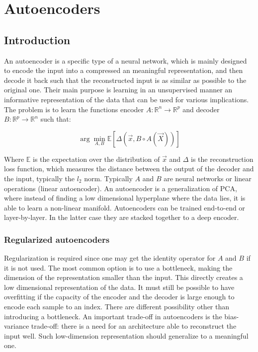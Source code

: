 \chapter{Autoencoders}

\section{Introduction}
An autoencoder is a specific type of a neural network, which is mainly designed to encode the input into a compressed an meaningful representation, and then decode it back such that the reconstructed input is as similar as possible to the original one.
Their main purpose is learning in an unsupervised manner an informative representation of the data that can be used for various implications.
The problem is to learn the functions encoder $A:\mathbb{R}^n\rightarrow\mathbb{R}^p$ and decoder $B:\mathbb{R}^p\rightarrow \mathbb{R}^n$ such that:

$$\arg\min\limits_{A, B}\mathbb{E}[\Delta(\vec{x}, B\circ A(\vec{X}))]$$

Where $\mathbb{E}$ is the expectation over the distribution of $\vec{x}$ and $\Delta$ is the reconstruction loss function, which measures the distance between the output of the decoder and the input, typically the $l_2$ norm.
Typically $A$ and $B$ are neural networks or linear operations (linear autoencoder).
An autoencoder is a generalization of PCA, where instead of finding a low dimensional hyperplane where the data lies, it is able to learn a non-linear manifold.
Autoencoders can be trained end-to-end or layer-by-layer.
In the latter case they are stacked together to a deep encoder.

	\subsection{Regularized autoencoders}
	Regularization is required since one may get the identity operator for $A$ and $B$ if it is not used.
	The most common option is to use a bottleneck, making the dimension of the representation smaller than the input.
	This directly creates a low dimensional representation of the data.
	It must still be possible to have overfitting if the capacity of the encoder and the decoder is large enough to encode each sample to an index.
	There are different possibility other than introducing a bottleneck.
	An important trade-off in autoencoders is the bias-variance trade-off: there is a need for an architecture able to reconstruct the input well.
	Such low-dimension representation should generalize to a meaningful one.

